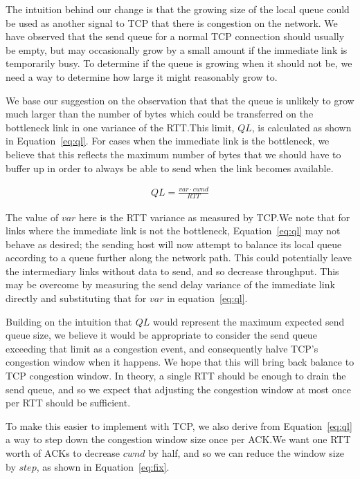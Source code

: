 The intuition behind our change is that the growing size of the local queue
could be used as another signal to TCP that there is congestion on the network.
We have observed that the send queue for a
normal TCP connection should usually be empty, but may occasionally grow by
a small amount if the immediate link is temporarily busy. To determine if the queue is
growing when it should not be, we need a way to determine how large it might
reasonably grow to.

We base our suggestion on the observation that that the queue is unlikely to
grow much larger than the number of bytes which could be transferred on the
bottleneck link in one variance of the RTT.\@ This limit, $QL$, is calculated
as shown in Equation~\ref{eq:ql}. For cases when the immediate link
is the bottleneck, we believe that this reflects the maximum number of bytes that
we should have to buffer up in order to always be able to send when the link becomes available. 

\begin{align}
  QL = \frac{var \cdot cwnd}{RTT}\label{eq:ql}
\end{align}

The value of $var$ here is the RTT
variance as measured by TCP.\@ We note that for links where the immediate link is not
the bottleneck,
Equation~\ref{eq:ql} may not behave as desired; the sending host will now
attempt to balance its local queue according to a queue further along the
network path. This could potentially leave the intermediary links without data
to send, and so decrease throughput. This may be overcome by measuring the
send delay variance
of the immediate link directly and substituting that for $var$ in
equation~\ref{eq:ql}.

Building on the intuition that $QL$ would represent the maximum expected send
queue size, we believe it would be appropriate to consider the send queue
exceeding that limit as a congestion event, and consequently halve TCP's congestion
window when it happens. We hope that this will bring back balance to TCP congestion window. In
theory, a single RTT should be enough to drain the send queue, and so we expect
that adjusting the congestion window at most once per RTT should be sufficient.

To make this easier to implement with TCP, we also derive from Equation~\ref{eq:ql}
a way to step down the congestion window size once per ACK.\@ We want one RTT
worth of ACKs to decrease $cwnd$ by half, and so we can reduce the window size
by $step$, as shown in Equation~\ref{eq:fix}.


